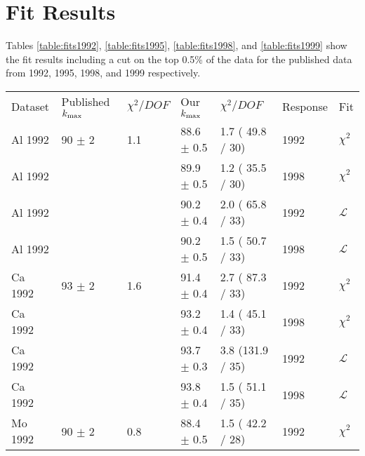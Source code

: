 


\section{Fit Results}

Tables \ref{table:fits1992}, \ref{table:fits1995}, \ref{table:fits1998}, and \ref{table:fits1999}
show the fit results including a cut on the top 0.5\% of the data for the published data
from 1992, 1995, 1998, and 1999 respectively.

\begin{table}[h]
  \begin{center}
    \begin{tabular}{|l||l|l|l|l|l|l|}
      \hline
      Dataset & Published $\mbox{$k_{\rm max}$}$ & $\chi^2 / DOF$ & Our $\mbox{$k_{\rm max}$}$ & $\chi^2 / DOF$  & Response & Fit \\
      \hhline{|=||=|=|=|=|=|=|}
      Al 1992 & 90   $\pm$ 2   & 1.1 & 88.6 $\pm$ 0.5 & 1.7 ( 49.8 / 30) & 1992 & $\chi^2$      \\
      Al 1992 &                &     & 89.9 $\pm$ 0.5 & 1.2 ( 35.5 / 30) & 1998 & $\chi^2$      \\
      Al 1992 &                &     & 90.2 $\pm$ 0.4 & 2.0 ( 65.8 / 33) & 1992 & $\mathcal{L}$ \\
      Al 1992 &                &     & 90.2 $\pm$ 0.5 & 1.5 ( 50.7 / 33) & 1998 & $\mathcal{L}$ \\
      \hline                                                                                    
      Ca 1992 & 93   $\pm$ 2   & 1.6 & 91.4 $\pm$ 0.4 & 2.7 ( 87.3 / 33) & 1992 & $\chi^2$      \\
      Ca 1992 &                &     & 93.2 $\pm$ 0.4 & 1.4 ( 45.1 / 33) & 1998 & $\chi^2$      \\
      Ca 1992 &                &     & 93.7 $\pm$ 0.3 & 3.8 (131.9 / 35) & 1992 & $\mathcal{L}$ \\
      Ca 1992 &                &     & 93.8 $\pm$ 0.4 & 1.5 ( 51.1 / 35) & 1998 & $\mathcal{L}$ \\
      \hline                                                                                    
      Mo 1992 & 90   $\pm$ 2   & 0.8 & 88.4 $\pm$ 0.5 & 1.5 ( 42.2 / 28) & 1992 & $\chi^2$      \\

\end{tabular}
\end{center}
\end{table}
